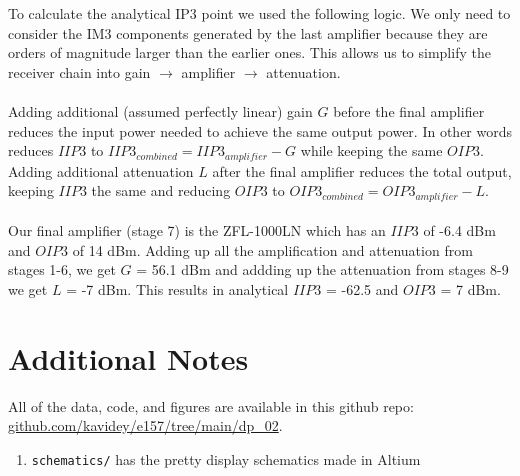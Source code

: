 \documentclass[letterpaper,12pt]{article}
\begin{document}
\noindent
To calculate the analytical IP3 point we used the following logic. We only need to consider the IM3 components generated by the last amplifier because they are orders of magnitude larger than the earlier ones. This allows us to simplify the receiver chain into gain $\to$ amplifier $\to$ attenuation.
\\
\\
\noindent
Adding additional (assumed perfectly linear) gain $G$ before the final amplifier reduces the input power needed to achieve the same output power. In other words reduces $IIP3$ to $IIP3_{combined} = IIP3_{amplifier} - G$ while keeping the same $OIP3$. Adding additional attenuation $L$ after the final amplifier reduces the total output, keeping $IIP3$ the same and reducing $OIP3$ to $OIP3_{combined} = OIP3_{amplifier} - L$.
\\
\\
\noindent
Our final amplifier (stage 7) is the ZFL-1000LN which has an $IIP3$ of -6.4 dBm and $OIP3$ of 14 dBm. Adding up all the amplification and attenuation from stages 1-6, we get $G$ = 56.1 dBm and addding up the attenuation from stages 8-9 we get $L$ = -7 dBm. This results in analytical $IIP3$ = -62.5 and $OIP3$ = 7 dBm.



\section{Additional Notes}
All of the data, code, and figures are available in this github repo: \url{github.com/kavidey/e157/tree/main/dp_02}.
\begin{enumerate}
  \item \texttt{schematics/} has the pretty display schematics made in Altium
\end{enumerate}
\end{document}
